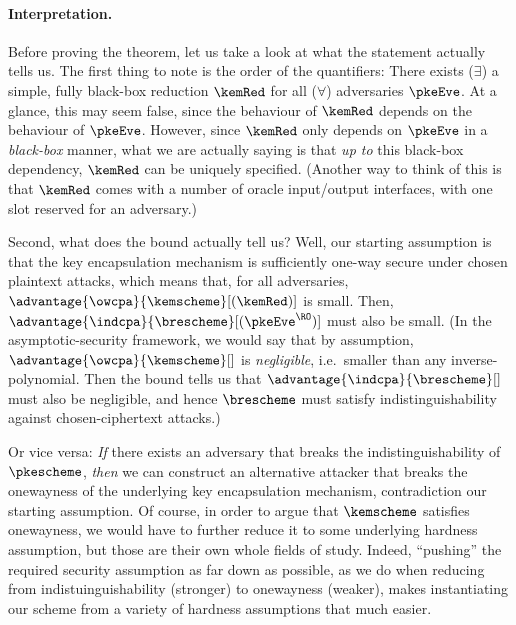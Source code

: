     \paragraph{Interpretation.}
      Before proving the theorem, let us take a look at what the statement
        actually tells us.
        The first thing to note is the order of the quantifiers: There exists
        ($\exists$) a simple, fully black-box reduction
        $\kemRed$ for all ($\forall$) adversaries $\pkeEve$. At a glance, this
        may seem false, since the behaviour of $\kemRed$ depends on the behaviour
        of $\pkeEve$. However, since $\kemRed$ only
        depends on $\pkeEve$ in a \emph{black-box} manner, what we are actually
        saying is that \emph{up to} this black-box dependency, $\kemRed$ can
        be uniquely specified. (Another way to think of this is that $\kemRed$
        comes with a number of oracle input/output interfaces, with one slot
        reserved for an adversary.)

      Second, what does the bound actually tell us? Well, our starting assumption is that
        the key encapsulation mechanism is sufficiently one-way secure under chosen plaintext
        attacks, which means that, for all adversaries,
        $\advantage{\owcpa}{\kemscheme}[(\kemRed)]$ is
        small. Then, $\advantage{\indcpa}{\brescheme}[(\pkeEve^{\RO})]$
        must also be small. 
        (In the asymptotic-security framework, we would say that 
        by assumption, $\advantage{\owcpa}{\kemscheme}[]$ is
        \emph{negligible}, i.e.\ smaller than any inverse-polynomial. Then the
        bound tells us that $\advantage{\indcpa}{\brescheme}[]$ must
        also be negligible, and hence $\brescheme$ must satisfy
        indistinguishability against chosen-ciphertext attacks.) 

      Or vice versa:
        \emph{If} there exists an adversary that breaks the indistinguishability
        of $\pkescheme$, \emph{then} we can construct an alternative attacker
        that breaks the onewayness of the underlying key encapsulation
        mechanism, contradiction our starting assumption.
        Of course, in order to argue that $\kemscheme$ satisfies onewayness, we
        would have to further reduce it to some underlying hardness assumption,
        but those are their own whole fields of study. Indeed, ``pushing'' the
        required security assumption as far down as possible, as we do when reducing
        from indistuinguishability (stronger) to onewayness (weaker), makes
        instantiating our scheme from a variety of hardness assumptions that
        much easier.

